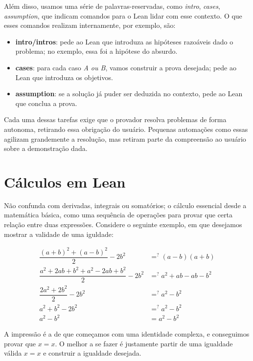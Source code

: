 Além disso, usamos uma série de palavras-reservadas, como \textit{intro}, \textit{cases}, \textit{assumption}, que indicam comandos para o Lean lidar com esse contexto. O que esses comandos realizam internamente, por exemplo, são:

\begin{itemize}
    \item \textbf{intro/intros}: pede ao Lean que introduza as hipóteses razoáveis dado o problema; no exemplo, essa foi a hipótese do absurdo.
    \item \textbf{cases}: para cada caso \textit{A ou B}, vamos construir a prova desejada; pede ao Lean que introduza os objetivos.
    \item \textbf{assumption}: se a solução já puder ser deduzida no contexto, pede ao Lean que conclua a prova.
\end{itemize}

\noindent Cada uma dessas tarefas exige que o provador resolva problemas de forma autonoma, retirando essa obrigação do usuário. Pequenas automações como essas agilizam grandemente a resolução, mas retiram parte da compreensão ao usuário sobre a demonstração dada.

\section{Cálculos em Lean}
Não confunda com derivadas, integrais ou somatórios; o cálculo essencial desde a matemática básica, como uma sequência de operações para provar que certa relação entre duas expressões. Considere o seguinte exemplo, em que desejamos mostrar a validade de uma iguldade:

\begin{equation*}
    \begin{aligned}
      \dfrac{(a+b)^2+(a-b)^2}{2}-2b^2 &=^? (a-b)(a+b)\\
      \dfrac{a^2+2ab+b^2+a^2-2ab+b^2}{2}-2b^2 &=^? a^2+ab-ab-b^2\\
      \dfrac{2a^2+2b^2}{2}-2b^2 &=^? a^2-b^2\\
      a^2+b^2-2b^2 &=^? a^2-b^2\\
      a^2-b^2 &= a^2-b^2
    \end{aligned}
\end{equation*}

\noindent A impressão é a de que começamos com uma identidade complexa, e conseguimos provar que $x=x$. O melhor a se fazer é justamente partir de uma igualdade válida $x=x$ e construir a igualdade desejada.

